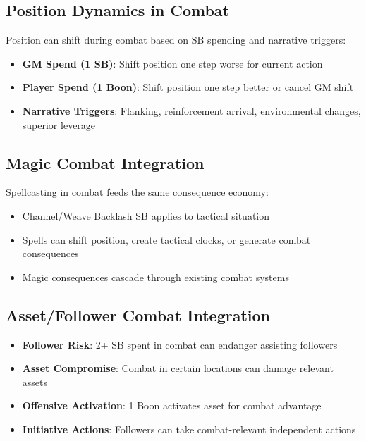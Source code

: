 \subsection{Position Dynamics in Combat}

Position can shift during combat based on SB spending and narrative triggers:

\begin{itemize}
    \item \textbf{GM Spend (1 SB)}: Shift position one step worse for current action
    \item \textbf{Player Spend (1 Boon)}: Shift position one step better or cancel GM shift
    \item \textbf{Narrative Triggers}: Flanking, reinforcement arrival, environmental changes, superior leverage
\end{itemize}

\subsection{Magic Combat Integration}

Spellcasting in combat feeds the same consequence economy:

\begin{itemize}
    \item Channel/Weave Backlash SB applies to tactical situation
    \item Spells can shift position, create tactical clocks, or generate combat consequences
    \item Magic consequences cascade through existing combat systems
\end{itemize}

\subsection{Asset/Follower Combat Integration}

\begin{itemize}
    \item \textbf{Follower Risk}: 2+ SB spent in combat can endanger assisting followers
    \item \textbf{Asset Compromise}: Combat in certain locations can damage relevant assets  
    \item \textbf{Offensive Activation}: 1 Boon activates asset for combat advantage
    \item \textbf{Initiative Actions}: Followers can take combat-relevant independent actions
\end{itemize}

